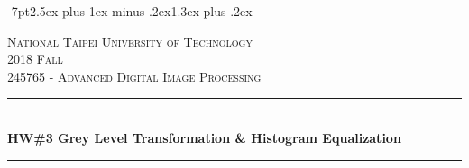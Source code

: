 \titlespacing*{\section} {-7pt}{2.5ex plus 1ex minus .2ex}{1.3ex plus .2ex}




\begin{titlepage} %
	\newcommand{\HRule}{\rule{\linewidth}{0.5mm}} %
					
	\center %
					
					
	\textsc{\LARGE National Taipei University of Technology}\\[1.5cm] %
					
	\textsc{\Large 2018 Fall}\\[0.5cm] %
					
	\textsc{\large 245765 - Advanced Digital Image Processing}\\[0.5cm] %
					
					
	\HRule\\[0.4cm]
					
	{\huge\bfseries HW\#3 Grey Level Transformation \& Histogram Equalization}\\[0.4cm] %
					
	\HRule\\[1.5cm]
					

\end{titlepage}
